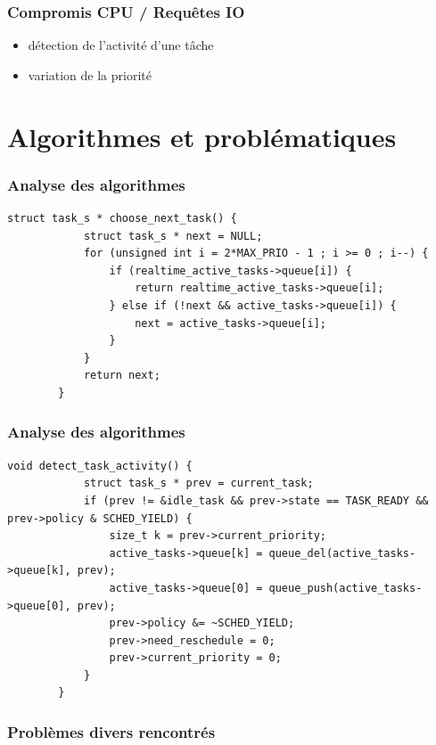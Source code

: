 \documentclass{beamer}
\begin{document}
\begin{frame}
    \frametitle{Compromis CPU / Requêtes IO}

    \begin{itemize}
        \item détection de l'activité d'une tâche
        \item variation de la priorité
    \end{itemize}
\end{frame}

\section{Algorithmes et problématiques}

\begin{frame}[fragile]
    \frametitle{Analyse des algorithmes}

    \begin{lstlisting}[caption=Choix de la prochaine tâche à exécuter]
        struct task_s * choose_next_task() {
            struct task_s * next = NULL;
            for (unsigned int i = 2*MAX_PRIO - 1 ; i >= 0 ; i--) {
                if (realtime_active_tasks->queue[i]) {
                    return realtime_active_tasks->queue[i];
                } else if (!next && active_tasks->queue[i]) {
                    next = active_tasks->queue[i];
                }
            }
            return next;
        }
    \end{lstlisting}
\end{frame}

\begin{frame}[fragile]
    \frametitle{Analyse des algorithmes}

    \begin{lstlisting}[caption=Détection de l'activité d'une tâche (IO/CPU)]
        void detect_task_activity() {
            struct task_s * prev = current_task;
            if (prev != &idle_task && prev->state == TASK_READY && prev->policy & SCHED_YIELD) {
                size_t k = prev->current_priority;
                active_tasks->queue[k] = queue_del(active_tasks->queue[k], prev);
                active_tasks->queue[0] = queue_push(active_tasks->queue[0], prev);
                prev->policy &= ~SCHED_YIELD;
                prev->need_reschedule = 0;
                prev->current_priority = 0;
            }
        }
    \end{lstlisting}
\end{frame}

\begin{frame}
    \frametitle{Problèmes divers rencontrés}


\end{frame}
\end{document}
